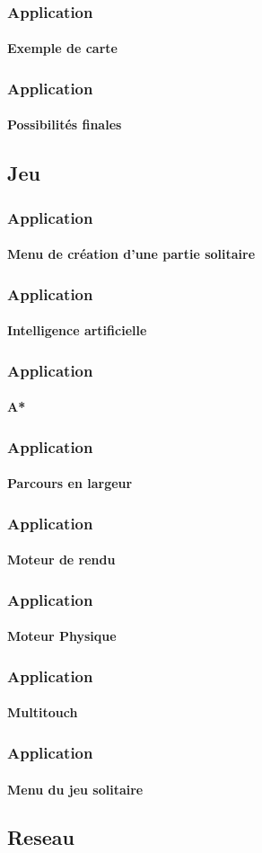 	\begin{frame}
	\frametitle{Application}
	\framesubtitle{Exemple de carte}
	
	\end{frame}
	
	\begin{frame}
	\frametitle{Application}
	\framesubtitle{Possibilités finales}
	
	\end{frame}

\subsection{Jeu}

\begin{frame}
\frametitle{Application}
\framesubtitle{Menu de création d'une partie solitaire}

\end{frame}

\begin{frame}
\frametitle{Application}
\framesubtitle{Intelligence artificielle}

\end{frame}

\begin{frame}
\frametitle{Application}
\framesubtitle{A*}

\end{frame}

\begin{frame}
\frametitle{Application}
\framesubtitle{Parcours en largeur}

\end{frame}

\begin{frame}
\frametitle{Application}
\framesubtitle{Moteur de rendu}

\end{frame}

\begin{frame}
\frametitle{Application}
\framesubtitle{Moteur Physique}

\end{frame}

\begin{frame}
\frametitle{Application}
\framesubtitle{Multitouch}

\end{frame}

\begin{frame}
\frametitle{Application}
\framesubtitle{Menu du jeu solitaire}

\end{frame}


\subsection{Reseau}








